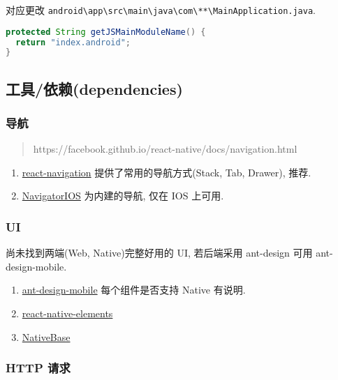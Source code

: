 对应更改
\lstinline!android\app\src\main\java\com\**\MainApplication.java!.

\begin{lstlisting}[language=Java]
protected String getJSMainModuleName() {
  return "index.android";
}
\end{lstlisting}

\subsection{工具/依赖(dependencies)}\label{ux5de5ux5177ux4f9dux8d56dependencies}

\subsubsection{导航}\label{ux5bfcux822a}

\begin{quote}
https://facebook.github.io/react-native/docs/navigation.html
\end{quote}

\begin{enumerate}
\def\labelenumi{\arabic{enumi}.}
\tightlist
\item
  \href{https://github.com/react-navigation/react-navigation}{react-navigation}
  提供了常用的导航方式(Stack, Tab, Drawer), 推荐.
\item
  \href{https://facebook.github.io/react-native/docs/navigatorios.html}{NavigatorIOS}
  为内建的导航, 仅在 IOS 上可用.
\end{enumerate}

\subsubsection{UI}\label{ui}

尚未找到两端(Web, Native)完整好用的 UI, 若后端采用 ant-design 可用
ant-design-mobile.

\begin{enumerate}
\def\labelenumi{\arabic{enumi}.}
\tightlist
\item
  \href{https://github.com/ant-design/ant-design-mobile}{ant-design-mobile}
  每个组件是否支持 Native 有说明.
\item
  \href{https://github.com/react-native-training/react-native-elements}{react-native-elements}
\item
  \href{https://github.com/GeekyAnts/NativeBase}{NativeBase}
\end{enumerate}

\subsubsection{HTTP 请求}\label{http-ux8bf7ux6c42}

